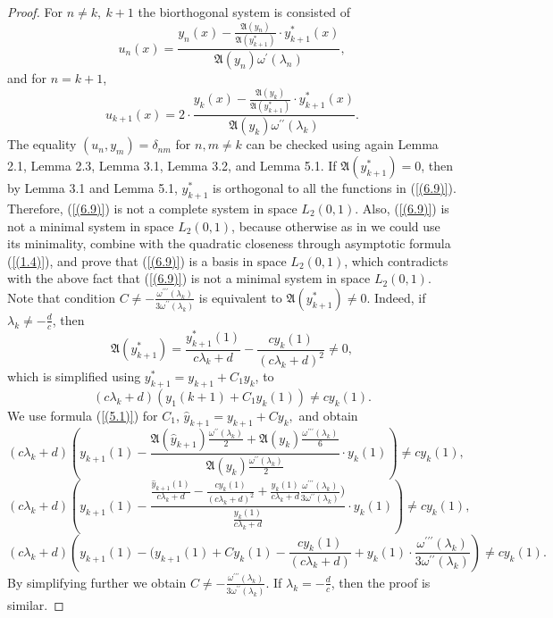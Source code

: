 \documentclass[pdflatex,sn-mathphys-num]{sn-jnl}%
\theoremstyle{thmstyleone}%
\theoremstyle{thmstyletwo}%
\theoremstyle{thmstylethree}%
\theoremstyle{definition}
\theoremstyle{remark}
\numberwithin{equation}{section}
\begin{document}
\begin{proof} For $n \ne k,\ k+1$ the biorthogonal system is consisted of
\begin{equation}
u_n(x)=\frac{y_n(x)-\frac{\mathfrak{A}(y_{n})}{\mathfrak{A}(y_{k+1}^{*})}\cdot y^*_{k+1}(x)}{ \mathfrak{A}(y_{n})\omega^\prime(\lambda_n)}
, \label{(6.10)}
\end{equation}
and for $n = k+1$,
\begin{equation}
u_{k+1}(x)=2\cdot\frac{y_{k}(x)-\frac{\mathfrak{A}(y_{k})}{\mathfrak{A}(y_{k+1}^{*})}\cdot y^*_{k+1}(x)}{ \mathfrak{A}(y_k)\omega^{\prime\prime}(\lambda_k)}
. \label{(6.11)}
\end{equation}
The equality $(u_n, y_m) = \delta_{nm}$ for $ n,m\neq k$ can be checked using again Lemma 2.1, Lemma 2.3, Lemma 3.1, Lemma 3.2, and Lemma 5.1.
If $\mathfrak{A}(y_{k+1}^{*}) = 0$, then by Lemma 3.1 and Lemma 5.1, $y_{k+1}^{*}$ is orthogonal to 
all the functions in (\ref{(6.9)}). Therefore, (\ref{(6.9)}) is not a complete system in space $L_{2}(0,1)$. Also, (\ref{(6.9)}) is not a minimal system in space $L_{2}(0,1)$, because otherwise as in \cite{aliyev4} we could use its minimality, combine with the quadratic closeness through asymptotic formula (\ref{(1.4)}), and prove that (\ref{(6.9)}) is a basis in space $L_{2}(0,1)$, which contradicts with the above fact that  (\ref{(6.9)}) is not a minimal system in space $L_{2}(0,1)$.
Note that condition $C\neq-\frac{\omega^{\prime\prime\prime}(\lambda_k)}{3\omega^{\prime\prime}(\lambda_k)}$ is equivalent to $\mathfrak{A}(y_{k+1}^{*})\ne 0$. Indeed, if $\lambda_k\neq-\frac{d}{c}$, then
\begin{equation}
 \mathfrak{A}(y^{*}_{k+1}) =
\frac{y^{*}_{k + 1}(1)}{c\lambda_{k}+d} - \frac{cy_{k}(1)}{{(c\lambda_{k}+d)}^{2}}\neq0, 
 \label{(6.11.1)}
\end{equation}
which is simplified using $y_{k+1}^* = y_{k+1} + C_1 y_k$, to
$$({c\lambda_{k}+d})({ y_{1}(k+1) + C_1 y_k(1)})\neq cy_k(1).$$
We use formula (\ref{(5.1)}) for $C_1$, \(
\hat{y}_{k+1} = y_{k+1} + Cy_k,
\) and obtain
$$
({c\lambda_{k}+d})\left( y_{k+1}(1) -\frac{\mathfrak{A}(\hat{y}_{k+1})\frac{\omega^{\prime\prime}(\lambda_k)}{2}+\mathfrak{A}(y_k)\frac{\omega^{\prime\prime\prime}(\lambda_k)}{6}}{\mathfrak{A}(y_k)\frac{\omega^{\prime\prime}(\lambda_k)}{2}}\cdot y_k(1)\right)\neq cy_k(1),$$
$$
({c\lambda_{k}+d})\left( y_{k+1}(1) -\frac{\frac{\hat{y}_{k+1}(1)}{c\lambda_{k}+d} - \frac{cy_{k}(1)}{{(c\lambda_{k}+d)}^{2}}+\frac{{y}_{k}(1)}{c\lambda_{k}+d}\frac{\omega^{\prime\prime\prime}(\lambda_k)}{3\omega^{\prime\prime}(\lambda_k)})}{\frac{{y}_{k}(1)}{c\lambda_{k}+d}}\cdot y_k(1)\right)\neq cy_k(1),$$
$$
({c\lambda_{k}+d})\left( y_{k+1}(1) -(y_{k+1}(1)+Cy_{k}(1)-\frac{cy_{k}(1)}{{(c\lambda_{k}+d)}}+y_{k}(1)\cdot\frac{\omega^{\prime\prime\prime}(\lambda_k)}{3\omega^{\prime\prime}(\lambda_k)}\right)\neq cy_k(1).
$$
By simplifying further we obtain
$C\neq-\frac{\omega^{\prime\prime\prime}(\lambda_k)}{3\omega^{\prime\prime}(\lambda_k)}$.
If $\lambda_k=-\frac{d}{c}$, then the proof is similar.
\end{proof}
\end{document}
